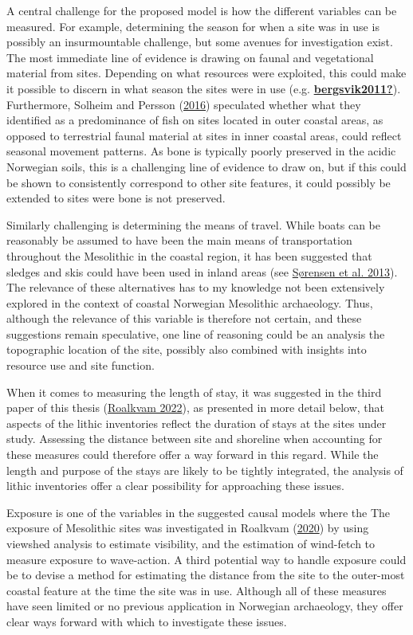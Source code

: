 \documentclass[
  12pt,
  a4paper,
  oneside]{book}
\begin{document}
A central challenge for the proposed model is how the different variables can be measured. For example, determining the season for when a site was in use is possibly an insurmountable challenge, but some avenues for investigation exist. The most immediate line of evidence is drawing on faunal and vegetational material from sites. Depending on what resources were exploited, this could make it possible to discern in what season the sites were in use (e.g. \protect\hyperlink{ref-bergsvik2011}{\textbf{bergsvik2011?}}). Furthermore, Solheim and Persson (\protect\hyperlink{ref-solheim2016}{2016}) speculated whether what they identified as a predominance of fish on sites located in outer coastal areas, as opposed to terrestrial faunal material at sites in inner coastal areas, could reflect seasonal movement patterns. As bone is typically poorly preserved in the acidic Norwegian soils, this is a challenging line of evidence to draw on, but if this could be shown to consistently correspond to other site features, it could possibly be extended to sites were bone is not preserved.

Similarly challenging is determining the means of travel. While boats can be reasonably be assumed to have been the main means of transportation throughout the Mesolithic in the coastal region, it has been suggested that sledges and skis could have been used in inland areas (see \protect\hyperlink{ref-suxf8rensen2013}{Sørensen et al. 2013}). The relevance of these alternatives has to my knowledge not been extensively explored in the context of coastal Norwegian Mesolithic archaeology. Thus, although the relevance of this variable is therefore not certain, and these suggestions remain speculative, one line of reasoning could be an analysis the topographic location of the site, possibly also combined with insights into resource use and site function.

When it comes to measuring the length of stay, it was suggested in the third paper of this thesis (\protect\hyperlink{ref-roalkvam2022}{Roalkvam 2022}), as presented in more detail below, that aspects of the lithic inventories reflect the duration of stays at the sites under study. Assessing the distance between site and shoreline when accounting for these measures could therefore offer a way forward in this regard. While the length and purpose of the stays are likely to be tightly integrated, the analysis of lithic inventories offer a clear possibility for approaching these issues.

Exposure is one of the variables in the suggested causal models where the
The exposure of Mesolithic sites was investigated in Roalkvam (\protect\hyperlink{ref-roalkvam2020}{2020}) by using viewshed analysis to estimate visibility, and the estimation of wind-fetch to measure exposure to wave-action. A third potential way to handle exposure could be to devise a method for estimating the distance from the site to the outer-most coastal feature at the time the site was in use. Although all of these measures have seen limited or no previous application in Norwegian archaeology, they offer clear ways forward with which to investigate these issues.
\end{document}
